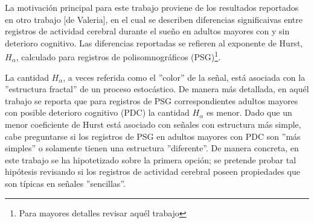 %

La motivaci\'on principal para este trabajo proviene de los resultados reportados en otro trabajo 
[de Valeria], en el cual se describen diferencias significaivas entre registros de actividad
cerebral durante el sue\~no en adultos mayores con y sin deterioro cognitivo. Las diferencias 
reportadas se refieren al exponente de Hurst, $H_\alpha$, calculado para registros de
polisomnogr\'aficos (PSG)\footnote{Para mayores detalles revisar aqu\'el trabajo}.

La cantidad $H_\alpha$, a veces referida como el ''color'' de la se\~nal, est\'a asociada con la
''estructura fractal'' de un proceso estoc\'astico. De manera m\'as detallada, en aqu\'el trabajo 
se reporta que para registros de PSG correspondientes adultos mayores con posible deterioro
cognitivo (PDC) la cantidad $H_\alpha$ es menor. Dado que un menor coeficiente de Hurst est\'a 
asociado con se\~nales con estructura m\'as simple, cabe preguntarse si los registros de PSG en 
adultos mayores con PDC son ''m\'as simples'' o solamente tienen una estructura ''diferente''. De 
manera concreta, en este trabajo se ha hipotetizado sobre la primera opci\'on; se pretende probar
tal hip\'otesis revisando si los registros de actividad cerebral poseen propiedades que son
t\'ipicas en se\~nales ''sencillas''.

